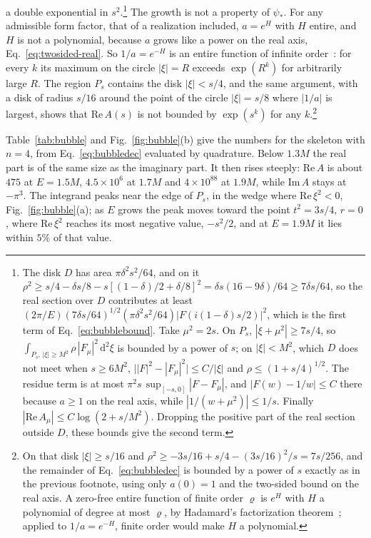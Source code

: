 \documentclass[a4paper,11pt]{article}
\newcommand{\dd}{\mathrm{d}}
\begin{document}
a double exponential in $s^2$.\footnote{The disk $D$ has area $\pi\delta^2s^2/64$, and on it $\rho^2\ge s/4-\delta s/8-s[(1-\delta)/2+\delta/8]^2=\delta s(16-9\delta)/64\ge7\delta s/64$, so the real section over $D$ contributes at least $(2\pi/E)(7\delta s/64)^{1/2}(\pi\delta^2s^2/64)|F(i(1-\delta)s/2)|^2$, which is the first term of Eq.~\eqref{eq:bubblebound}. Take $\mu^2=2s$. On $P_s$, $|\xi+\mu^2|\ge7s/4$, so $\int_{P_s,\,|\xi|\ge M^2}\rho\,|F_\mu|^2\,\dd^2\xi$ is bounded by a power of $s$; on $|\xi|<M^2$, which $D$ does not meet when $s\ge6M^2$, $\bigl||F|^2-|F_\mu|^2\bigr|\le C/|\xi|$ and $\rho\le(1+s/4)^{1/2}$. The residue term is at most $\pi^2s\,\sup_{[-s,0]}|F-F_\mu|$, and $|F(w)-1/w|\le C$ there because $a\ge1$ on the real axis, while $|1/(w+\mu^2)|\le1/s$. Finally $|\mathrm{Re}\,A_\mu|\le C\log(2+s/M^2)$. Dropping the positive part of the real section outside $D$, these bounds give the second term.} The growth is not a property of $\psi_*$. For any admissible form factor, that of a realization included, $a=e^{H}$ with $H$ entire, and $H$ is not a polynomial, because $a$ grows like a power on the real axis, Eq.~\eqref{eq:twosided-real}. So $1/a=e^{-H}$ is an entire function of infinite order~\cite{Titchmarsh1939}: for every $k$ its maximum on the circle $|\xi|=R$ exceeds $\exp(R^k)$ for arbitrarily large $R$. The region $P_s$ contains the disk $|\xi|<s/4$, and the same argument, with a disk of radius $s/16$ around the point of the circle $|\xi|=s/8$ where $|1/a|$ is largest, shows that $\mathrm{Re}\,A(s)$ is not bounded by $\exp(s^k)$ for any $k$.\footnote{On that disk $|\xi|\ge s/16$ and $\rho^2\ge-3s/16+s/4-(3s/16)^2/s=7s/256$, and the remainder of Eq.~\eqref{eq:bubbledec} is bounded by a power of $s$ exactly as in the previous footnote, using only $a(0)=1$ and the two-sided bound on the real axis. A zero-free entire function of finite order $\varrho$ is $e^{H}$ with $H$ a polynomial of degree at most $\varrho$, by Hadamard's factorization theorem~\cite{Titchmarsh1939}; applied to $1/a=e^{-H}$, finite order would make $H$ a polynomial.}

Table~\ref{tab:bubble} and Fig.~\ref{fig:bubble}(b) give the numbers for the skeleton with $n=4$, from Eq.~\eqref{eq:bubbledec} evaluated by quadrature. Below $1.3M$ the real part is of the same size as the imaginary part. It then rises steeply: $\mathrm{Re}\,A$ is about $475$ at $E=1.5M$, $4.5\times10^6$ at $1.7M$ and $4\times10^{88}$ at $1.9M$, while $\mathrm{Im}\,A$ stays at $-\pi^3$. The integrand peaks near the edge of $P_s$, in the wedge where $\mathrm{Re}\,\xi^2<0$, Fig.~\ref{fig:bubble}(a); as $E$ grows the peak moves toward the point $t^2=3s/4$, $r=0$, where $\mathrm{Re}\,\xi^2$ reaches its most negative value, $-s^2/2$, and at $E=1.9M$ it lies within $5\%$ of that value.
\end{document}
